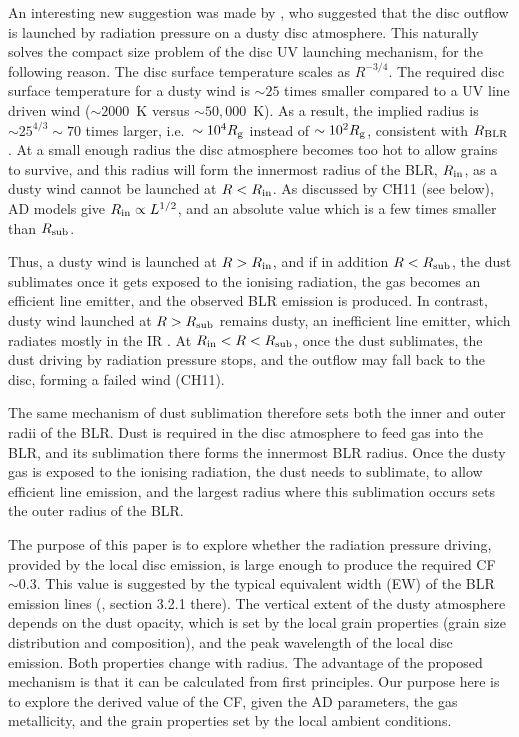 \documentclass[a4paper,fleqn,usenatbib]{mnras}
\begin{document}
An interesting new suggestion was made by \citet[hereafter CH11]{CH11}, who suggested that the disc 
outflow is launched by radiation pressure on a dusty disc atmosphere. This naturally solves the compact size problem
of the disc UV launching mechanism, for the following reason. The disc surface temperature scales as $R^{-3/4}$. 
The required disc surface temperature for a dusty wind is $\sim 25$ times smaller compared to a UV line driven wind 
($\sim 2000$~K versus $\sim 50,000$~K). As a result,  
the implied radius is 
$\sim 25^{4/3}\sim 70$ times larger, i.e.\ $\sim 10^4R_{\rm g}$ instead of $\sim 10^2R_{\rm g}$, consistent 
with $R_{\rm BLR}$. 
At a small enough radius the disc atmosphere becomes too hot to allow grains to survive, and this radius 
will form the innermost radius of the BLR, $R_{\rm in}$, as a dusty wind cannot be launched at $R<R_{\rm in}$.
As discussed by CH11 (see below), AD models give $R_{\rm in}\propto L^{1/2}$, and an absolute value which is
a few times smaller than $R_{\rm sub}$. 

Thus, a dusty wind is launched at $R>R_{\rm in}$, and if in addition $R<R_{\rm sub}$,
the dust sublimates once it gets exposed to the ionising radiation, the
gas becomes an efficient line emitter, and the observed BLR emission is produced.
In contrast, dusty wind launched at $R>R_{\rm sub}$ remains dusty, an inefficient line emitter, 
which radiates mostly in the IR \citep{paperI}. At $R_{\rm in}< R <R_{\rm sub}$, once the dust 
sublimates, the dust driving by radiation pressure stops, and the outflow 
may fall back to the disc, forming a failed wind (CH11).


The same mechanism of dust sublimation therefore sets both the inner and outer radii of the BLR. 
Dust is required in the disc atmosphere to feed gas into the BLR, and its sublimation there 
forms the innermost BLR radius. Once the dusty gas is exposed to the
ionising radiation, the dust needs to sublimate, to allow efficient line emission, 
and the largest radius where this sublimation occurs sets the 
outer radius of the BLR.


The purpose of this paper is to explore whether the radiation pressure driving,  
provided by the local disc emission, is large enough
to produce the required CF $\sim 0.3$. This value is suggested by the typical equivalent width (EW) of the BLR emission 
lines (\citealt{Korista97, Maiolino01, Ruff12, paperII}, section 3.2.1 there). 
The vertical extent of the dusty atmosphere depends on the dust opacity, which is set by the local grain properties (grain size distribution and composition),
and the peak wavelength of the local disc emission. Both properties change with radius. 
The advantage of the proposed mechanism 
is that it can be calculated from first principles. Our purpose here is to explore the derived value of 
the CF, given the AD parameters, the gas metallicity, and the grain properties set
by the local ambient conditions. 
\end{document}
